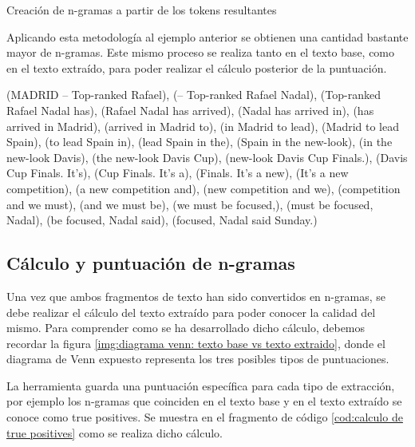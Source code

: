 \begin{codefloat}
  
  \caption{Creación de n-gramas a partir de los tokens resultantes}
  \label{cod:creacion de n-gramas a partir de los tokens resultantes}
\end{codefloat}

Aplicando esta metodología al ejemplo anterior se obtienen una cantidad bastante mayor de n-gramas. Este
mismo proceso se realiza tanto en el texto base, como en el texto extraído, para poder realizar el cálculo
posterior de la puntuación.

\begin{Schunk}
  \begin{Soutput}
(MADRID -- Top-ranked Rafael), (-- Top-ranked Rafael Nadal), 
(Top-ranked Rafael Nadal has), (Rafael Nadal has arrived), 
(Nadal has arrived in), (has arrived in Madrid), (arrived in Madrid to), 
(in Madrid to lead), (Madrid to lead Spain), (to lead Spain in), 
(lead Spain in the), (Spain in the new-look), (in the new-look Davis), 
(the new-look Davis Cup), (new-look Davis Cup Finals.), (Davis Cup Finals. It’s),
(Cup Finals. It’s a), (Finals. It’s a new), (It’s a new competition),
(a new competition and), (new competition and we), (competition and we must), 
(and we must be), (we must be focused,), (must be focused, Nadal),
(be focused, Nadal said), (focused, Nadal said Sunday.)
  \end{Soutput}
\end{Schunk}

\subsection{Cálculo y puntuación de n-gramas}
\label{subsec:calculo y puntuacion de n-gramas}

Una vez que ambos fragmentos de texto han sido convertidos en n-gramas, se debe realizar el cálculo del
texto extraído para poder conocer la calidad del mismo. Para comprender como se ha desarrollado dicho
cálculo, debemos recordar la figura \ref{img:diagrama venn: texto base vs texto extraido}, donde el 
diagrama de Venn expuesto representa los tres posibles tipos de puntuaciones.

La herramienta guarda una puntuación específica para cada tipo de extracción, por ejemplo los n-gramas que 
coinciden en el texto base y en el texto extraído se conoce como true positives. Se muestra en el fragmento 
de código \ref{cod:calculo de true positives} como se realiza dicho cálculo.

